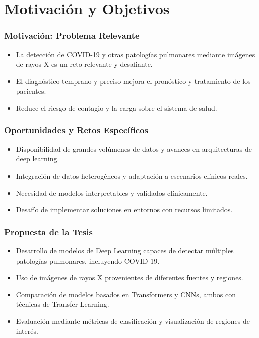 
\section{Motivación y Objetivos}

\begin{frame}
\frametitle{Motivación: Problema Relevante}
\begin{itemize}
    \item La detección de COVID-19 y otras patologías pulmonares mediante imágenes de rayos X es un reto relevante y desafiante.
    \item El diagnóstico temprano y preciso mejora el pronóstico y tratamiento de los pacientes.
    \item Reduce el riesgo de contagio y la carga sobre el sistema de salud.
\end{itemize}
\end{frame}

\begin{frame}
\frametitle{Oportunidades y Retos Específicos}
\begin{itemize}
    \item Disponibilidad de grandes volúmenes de datos y avances en arquitecturas de deep learning.
    \item Integración de datos heterogéneos y adaptación a escenarios clínicos reales.
    \item Necesidad de modelos interpretables y validados clínicamente.
    \item Desafío de implementar soluciones en entornos con recursos limitados.
\end{itemize}
\end{frame}

\begin{frame}
\frametitle{Propuesta de la Tesis}
\begin{itemize}
    \item Desarrollo de modelos de Deep Learning capaces de detectar múltiples patologías pulmonares, incluyendo COVID-19.
    \item Uso de imágenes de rayos X provenientes de diferentes fuentes y regiones.
    \item Comparación de modelos basados en Transformers y CNNs, ambos con técnicas de Transfer Learning.
    \item Evaluación mediante métricas de clasificación y visualización de regiones de interés.
\end{itemize}
\end{frame}

